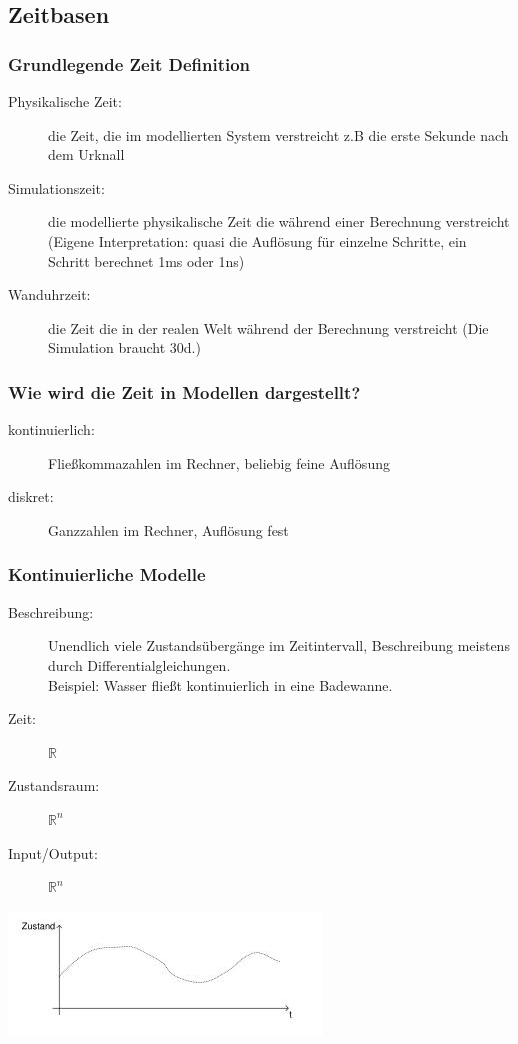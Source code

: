 \documentclass[11pt, fleqn, a4paper, leqno]{scrartcl} %
\begin{document}
	\subsection{Zeitbasen}
		\subsubsection{Grundlegende Zeit Definition}
			\begin{description}
				\item[Physikalische Zeit:] die Zeit, die im modellierten System verstreicht z.B die erste Sekunde nach dem Urknall
				\item[Simulationszeit:] die modellierte physikalische Zeit die während einer Berechnung verstreicht (Eigene Interpretation: quasi die Auflösung für einzelne Schritte, ein Schritt berechnet 1ms oder 1ns)
				\item[Wanduhrzeit:] die Zeit die in der realen Welt während der Berechnung verstreicht (Die Simulation braucht 30d.)
			\end{description}
		\subsubsection{Wie wird die Zeit in Modellen dargestellt?}
			\begin{description}
				\item[kontinuierlich:] Fließkommazahlen im Rechner, beliebig feine Auflösung
				\item[diskret:] Ganzzahlen im Rechner, Auflösung fest
			\end{description}
		\subsubsection{Kontinuierliche Modelle}
			\begin{description}
				\item[Beschreibung:] Unendlich viele Zustandsübergänge im Zeitintervall, Beschreibung meistens durch Differentialgleichungen.\\
				Beispiel: Wasser fließt kontinuierlich in eine Badewanne.
				\item[Zeit:] $\mathds{R}$
				\item[Zustandsraum:] $\mathds{R}^{n}$
				\item[Input/Output:] $\mathds{R}^{n}$
			\end{description}
			\begin{center}
				\includegraphics [scale=0.6]{images/kontinuierliche-modelle.jpg}
			\end{center}				
\end{document}
